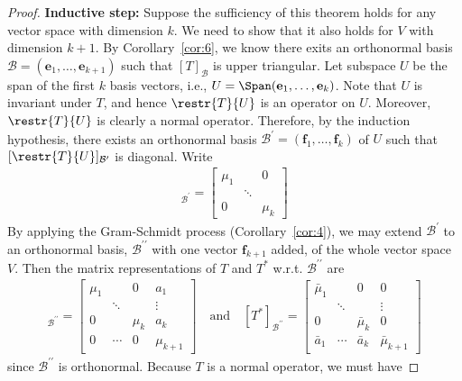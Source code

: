 \documentclass[thmcnt=section, color=blue, 12pt]{my-elegantbook}
\begin{document}
\begin{proof}
	\noindent \textbf{Inductive step:} Suppose the sufficiency of 
	this theorem holds for any vector space with dimension $k$.
	We need to show that it also holds for $V$ with dimension $k+1$.
	By Corollary~\ref{cor:6},
	we know there exits an orthonormal 
	basis $\mathcal{B} = (\mathbf{e}_1, \ldots, \mathbf{e}_{k+1})$
	such that $[T]_{\mathcal{B}}$ is upper triangular.
	Let subspace $U$ be the span of the first $k$ basis vectors, 
	i.e., $U = \Span (\mathbf{e}_1, \ldots, \mathbf{e}_k)$.
	Note that $U$ is invariant under $T$, 
	and hence $\restr{T}{U}$ is an operator on $U$.
	Moreover, $\restr{T}{U}$ is clearly a normal operator.
	Therefore, by the induction hypothesis,
	there exists an orthonormal 
	basis $\mathcal{B}^\prime = (\mathbf{f}_1, \ldots, \mathbf{f}_k)$ 
	of $U$ such that $[\restr{T}{U}]_{\mathcal{B}^\prime}$ is diagonal.
	Write 
	\begin{align*}
		[\restr{T}{U}]_{\mathcal{B}^\prime} =
		\begin{bmatrix}
			\mu_1 & & 0 \\
				  & \ddots & \\
			0 & & \mu_k
		\end{bmatrix}
	\end{align*}
	By applying the Gram-Schmidt process (Corollary~\ref{cor:4}), 
	we may extend $\mathcal{B}^\prime$ to an orthonormal 
	basis, $\mathcal{B}^{\prime\prime}$ with 
	one vector $\mathbf{f}_{k+1}$ added, 
	of the whole vector space $V$.
	Then the matrix representations of $T$ and $T^\ast$ 
	w.r.t. $\mathcal{B}^{\prime\prime}$ are
	\begin{align*}
		[T]_{\mathcal{B}^{\prime\prime}} =
		\begin{bmatrix}
			\mu_1 & & 0 & a_1\\
				  & \ddots & & \vdots \\
			0 & & \mu_k & a_k \\
			0  & \cdots & 0 & \mu_{k+1}
		\end{bmatrix}
		\quad \text{and} \quad 
		[T^\ast]_{\mathcal{B}^{\prime\prime}} =
		\begin{bmatrix}
			\bar{\mu}_1 & & 0 & 0\\
				  & \ddots & & \vdots \\
			0 & & \bar{\mu}_k & 0 \\
			\bar{a}_1  & \cdots & \bar{a}_k & \bar{\mu}_{k+1}
		\end{bmatrix}
	\end{align*}
	since $\mathcal{B}^{\prime\prime}$ is orthonormal.
	Because $T$ is a normal operator, we must have 

\end{proof}
\end{document}
